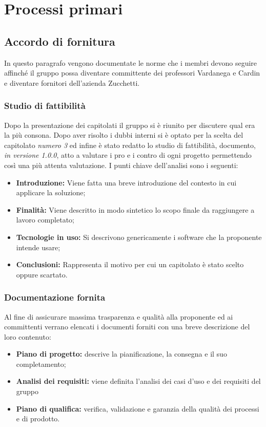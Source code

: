 \section{Processi primari}
    \subsection{Accordo di fornitura}
    	In questo paragrafo vengono documentate le norme che i membri devono seguire affinché il gruppo possa diventare committente dei professori Vardanega e Cardin e diventare fornitori dell'azienda Zucchetti.
    \subsubsection{Studio di fattibilità}
        Dopo la presentazione dei capitolati il gruppo si è riunito per discutere qual era la più consona. Dopo aver risolto i dubbi interni si è optato per la scelta del capitolato \textit{numero 3} ed infine è stato redatto lo studio di fattibilità, documento, \textit{in versione 1.0.0},  atto a valutare i pro e i contro di ogni progetto permettendo così una più attenta valutazione. \newline
        I punti chiave dell'analisi sono i seguenti:
    	\begin{itemize}
		   \item \textbf{Introduzione:} Viene fatta una breve introduzione del contesto in cui applicare la soluzione;
		   \item \textbf{Finalità:} Viene descritto in modo sintetico lo scopo finale da raggiungere a lavoro completato;
		   \item \textbf{Tecnologie in uso:} Si descrivono genericamente i software che la proponente intende usare;
		   \item \textbf{Conclusioni:} Rappresenta il motivo per cui un capitolato è stato scelto oppure scartato.
	    \end{itemize}
    \subsubsection{Documentazione fornita}
	    Al fine di assicurare massima trasparenza e qualità alla proponente ed ai committenti verrano elencati i documenti forniti con una breve descrizione del loro contenuto:
    	\begin{itemize}
	        \item \textbf{Piano di progetto:} descrive la pianificazione, la consegna e il suo completamento;
	        \item \textbf{Analisi dei requisiti:} viene definita l'analisi dei casi d'uso e dei requisiti del gruppo
	        \item \textbf{Piano di qualifica:} verifica, validazione e garanzia della qualità dei processi e di prodotto.
	    \end{itemize}
    \newpage    
